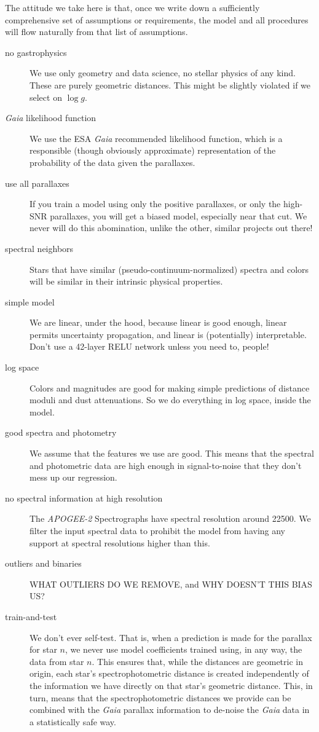 \documentclass[modern]{aastex631}
\newcommand{\acronym}[1]{{\small{#1}}}
\newcommand{\project}[1]{\textsl{#1}}
\newcommand{\ESA}{\acronym{ESA}}
\newcommand{\Gaia}{\project{Gaia}}
\newcommand{\APOGEE}{\project{\acronym{APOGEE-2}}}
\begin{document}
The attitude we take here is that, once we write down a sufficiently comprehensive set of
assumptions or requirements, the model and all procedures will flow naturally from that list of assumptions.
\begin{description}
\item[no gastrophysics] We use only geometry and data science, no stellar physics
  of any kind. These are purely geometric distances. This might be slightly
  violated if we select on $\log g$.
\item[\Gaia{} likelihood function] We use the \ESA{} \Gaia{}
  recommended likelihood function, which is a responsible (though obviously
  approximate) representation of the probability of the data given the
  parallaxes.
\item[use all parallaxes] If you train a model using only the positive
  parallaxes, or only the high-SNR parallaxes, you will get a biased model,
  especially near that cut. We never will do this abomination, unlike the
  other, similar projects out there!
\item[spectral neighbors] Stars that have similar (pseudo-continuum-normalized) spectra and colors will be similar in
  their intrinsic physical properties.
\item[simple model] We are linear, under the hood, because linear is good enough,
  linear permits uncertainty propagation, and linear is (potentially) interpretable. Don't use
  a 42-layer RELU network unless you need to, people!
\item[log space] Colors and magnitudes are good for making simple predictions of distance moduli and
  dust attenuations. So we do everything in log space, inside the model.
\item[good spectra and photometry] We assume that the features we use are
  good. This means that the spectral and photometric data are high enough in
  signal-to-noise that they don't mess up our regression.
\item[no spectral information at high resolution] The \APOGEE{} Spectrographs
  have spectral resolution around 22500. We filter the input spectral data
  to prohibit the model from having any support at spectral resolutions higher
  than this.
\item[outliers and binaries] WHAT OUTLIERS DO WE REMOVE, and WHY DOESN'T THIS BIAS US?
\item[train-and-test] We don't ever self-test. That is, when a prediction is
  made for the parallax for star $n$, we never use model coefficients trained
  using, in any way, the data from star $n$.
  This ensures that, while the distances are geometric in origin, each star's
  spectrophotometric distance is created
  independently of the information we have directly on that star's
  geometric distance. This, in turn, means that the spectrophotometric distances
  we provide can be combined with the \Gaia{} parallax information to de-noise
  the \Gaia{} data in a statistically safe way.
\end{description}
\end{document}
